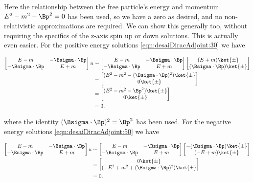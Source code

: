 Here the relationship between the free particle's energy and momentum $E^2 - m^2 - \Bp^2 = 0$ has been used, so we have a zero as desired, and no non-relativistic approximations are required.  We can show this generally too, without requiring the specifics of the z-axis spin up or down solutions.  This is actually even easier.  For the positive energy solutions \ref{eqn:desaiDiracAdjoint:30} we have

\begin{align*}
\begin{bmatrix}
E - m & - \Bsigma \cdot \Bp \\
- \Bsigma \cdot \Bp & E + m
\end{bmatrix}
u
&\sim
\begin{bmatrix}
E - m & - \Bsigma \cdot \Bp \\
- \Bsigma \cdot \Bp & E + m
\end{bmatrix}
\begin{bmatrix}
(E + m) \ket{\pm} \\
(\Bsigma \cdot \Bp) \ket{\pm}
\end{bmatrix} \\
&=
\begin{bmatrix}
(E^2 - m^2 - (\Bsigma \cdot \Bp)^2) \ket{\pm} \\
0 \ket{\pm}
\end{bmatrix} \\
&=
\begin{bmatrix}
(E^2 - m^2 - \Bp^2) \ket{\pm} \\
0 \ket{\pm}
\end{bmatrix} \\
&=
0,
\end{align*}

where the identity $(\Bsigma \cdot \Bp)^2 = \Bp^2$ has been used.  For the negative energy solutions \ref{eqn:desaiDiracAdjoint:50} we have

\begin{align*}
\begin{bmatrix}
E - m & - \Bsigma \cdot \Bp \\
- \Bsigma \cdot \Bp & E + m
\end{bmatrix}
u
&\sim
\begin{bmatrix}
E - m & - \Bsigma \cdot \Bp \\
- \Bsigma \cdot \Bp & E + m
\end{bmatrix}
\begin{bmatrix}
-(\Bsigma \cdot \Bp) \ket{\pm} \\
(-E + m) \ket{\pm} \\
\end{bmatrix} \\
&=
\begin{bmatrix}
0 \ket{\pm} \\
(-E^2 + m^2 + (\Bsigma \cdot \Bp)^2) \ket{\pm} \\
\end{bmatrix} \\
&=
0.
\end{align*}

